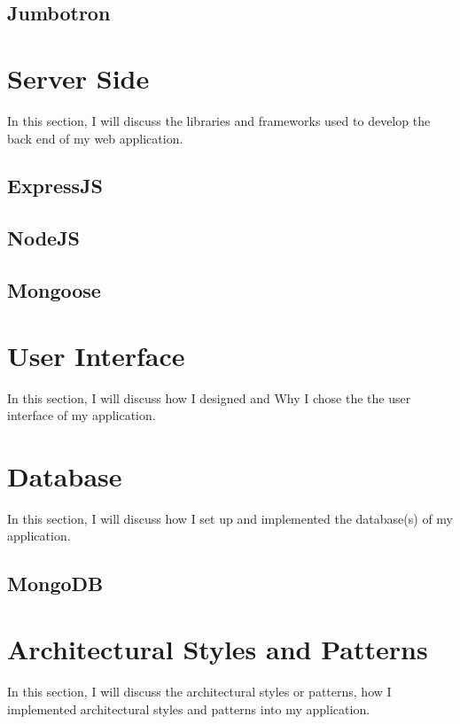 \subsection{Jumbotron}

\section{Server Side}

In this section, I will discuss the libraries and frameworks used to develop the back end of my web application.

\subsection{ExpressJS}

\subsection{NodeJS}

\subsection{Mongoose}

\section{User Interface}

In this section, I will discuss how I designed and Why I chose the the user interface of my application.

\section{Database}

In this section, I will discuss how I set up and implemented the database(s) of my application.

\subsection{MongoDB}

\section{Architectural Styles and Patterns}

In this section, I will discuss the architectural styles or patterns, how I implemented architectural styles and patterns into my application. 

